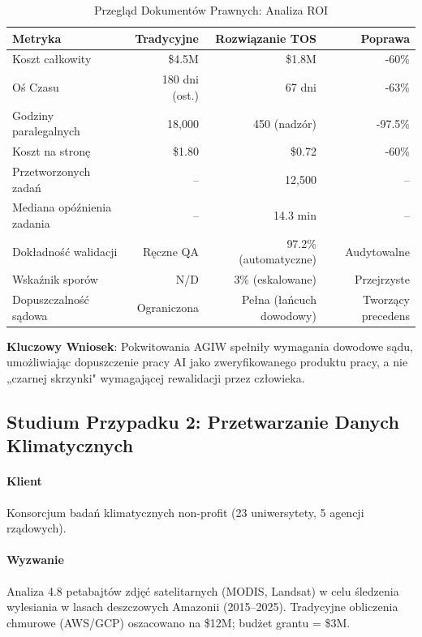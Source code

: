 \documentclass[11pt]{article}
\begin{document}
\begin{table}[H]
\centering
\caption{Przegląd Dokumentów Prawnych: Analiza ROI}
\label{tab:legal-roi}
\begin{tabular}{@{}lrrr@{}}
\toprule
\textbf{Metryka} & \textbf{Tradycyjne} & \textbf{Rozwiązanie TOS} & \textbf{Poprawa} \\ \midrule
Koszt całkowity & \$4.5M & \$1.8M & -60\% \\
Oś Czasu & 180 dni (ost.) & 67 dni & -63\% \\
Godziny paralegalnych & 18,000 & 450 (nadzór) & -97.5\% \\
Koszt na stronę & \$1.80 & \$0.72 & -60\% \\
Przetworzonych zadań & -- & 12,500 & -- \\
Mediana opóźnienia zadania & -- & 14.3 min & -- \\
Dokładność walidacji & Ręczne QA & 97.2\% (automatyczne) & Audytowalne \\
Wskaźnik sporów & N/D & 3\% (eskalowane) & Przejrzyste \\
Dopuszczalność sądowa & Ograniczona & Pełna (łańcuch dowodowy) & Tworzący precedens \\
\bottomrule
\end{tabular}
\end{table}

\textbf{Kluczowy Wniosek}: Pokwitowania AGIW spełniły wymagania dowodowe sądu, umożliwiając dopuszczenie pracy AI jako zweryfikowanego produktu pracy, a nie „czarnej skrzynki" wymagającej rewalidacji przez człowieka.

\subsection{Studium Przypadku 2: Przetwarzanie Danych Klimatycznych}

\paragraph{Klient} Konsorcjum badań klimatycznych non-profit (23 uniwersytety, 5 agencji rządowych).

\paragraph{Wyzwanie} Analiza 4.8 petabajtów zdjęć satelitarnych (MODIS, Landsat) w celu śledzenia wylesiania w lasach deszczowych Amazonii (2015--2025). Tradycyjne obliczenia chmurowe (AWS/GCP) oszacowano na \$12M; budżet grantu = \$3M.
\end{document}
